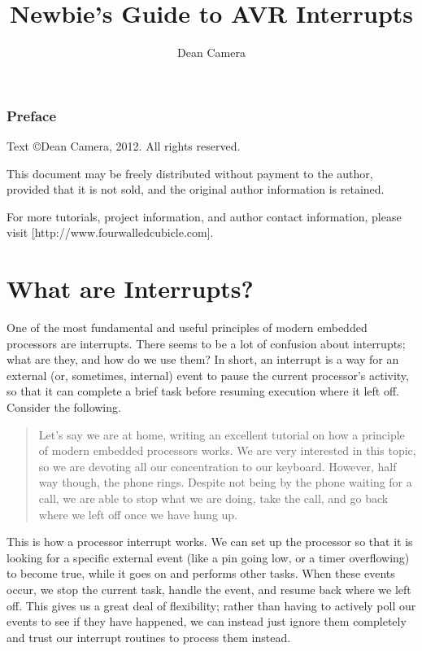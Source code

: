 \documentclass[a4paper,oneside]{book}
\begin{document}
\title{Newbie's Guide to AVR Interrupts}
\author{Dean Camera}
\maketitle

\cleardoublepage
\subsection*{Preface}
Text \copyright Dean Camera, 2012. All rights reserved.

This document may be freely distributed without payment to the author, provided that it is not sold, and the original author information is retained.

For more tutorials, project information, and author contact information, please visit \href{http://www.fourwalledcubicle.com}[http://www.fourwalledcubicle.com].

\cleardoublepage
\tableofcontents
\cleardoublepage


\label{chp:WhatAreInts}
\chapter{What are Interrupts?}

One of the most fundamental and useful principles of modern embedded processors are interrupts. There seems to be a lot of confusion about interrupts; what are they, and how do we use them? In short, an interrupt is a way for an external (or, sometimes, internal) event to pause the current processor's activity, so that it can complete a brief task before resuming execution where it left off. Consider the following.

\begin{quote}
Let's say we are at home, writing an excellent tutorial on how a principle of modern embedded processors works. We are very interested in this topic, so we are devoting all our concentration to our keyboard. However, half way though, the phone rings. Despite not being by the phone waiting for a call, we are able to stop what we are doing, take the call, and go back where we left off once we have hung up.
\end{quote}

This is how a processor interrupt works. We can set up the processor so that it is looking for a specific external event (like a pin going low, or a timer overflowing) to become true, while it goes on and performs other tasks. When these events occur, we stop the current task, handle the event, and resume back where we left off. This gives us a great deal of flexibility; rather than having to actively poll our events to see if they have happened, we can instead just ignore them completely and trust our interrupt routines to process them instead.
\end{document}
